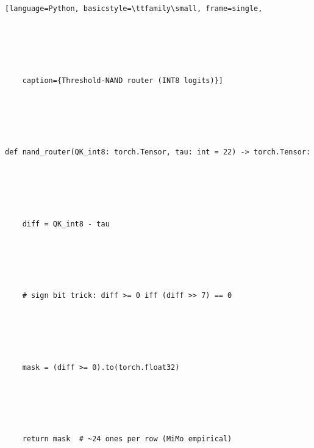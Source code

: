 \begin{lstlisting}[language=Python, basicstyle=\ttfamily\small, frame=single,





    caption={Threshold-NAND router (INT8 logits)}]





def nand_router(QK_int8: torch.Tensor, tau: int = 22) -> torch.Tensor:





    diff = QK_int8 - tau





    # sign bit trick: diff >= 0 iff (diff >> 7) == 0





    mask = (diff >= 0).to(torch.float32)





    return mask  # ~24 ones per row (MiMo empirical)





\end{lstlisting}
























































